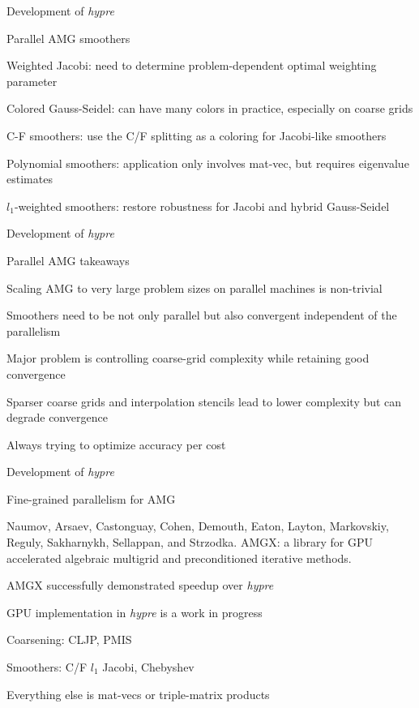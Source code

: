 \documentclass[18pt,xcolor=table]{beamer}
\begin{document}
\begin{frame}{Development of \emph{hypre}}
\begin{block}{Parallel AMG smoothers}
\bit
\item Weighted Jacobi: need to determine problem-dependent optimal weighting parameter
\item Colored Gauss-Seidel: can have many colors in practice, especially on coarse grids
\item C-F smoothers: use the C/F splitting as a coloring for Jacobi-like smoothers
\item Polynomial smoothers: application only involves mat-vec, but requires eigenvalue estimates
\item $l_1$-weighted smoothers: restore robustness for Jacobi and hybrid Gauss-Seidel
\eit
\end{block}
\end{frame}

\begin{frame}{Development of \emph{hypre}}
\begin{block}{Parallel AMG takeaways}
\bit
\item Scaling AMG to very large problem sizes on parallel machines is non-trivial
\item Smoothers need to be not only parallel but also convergent independent of the parallelism
\item Major problem is controlling coarse-grid complexity while retaining good convergence
\item Sparser coarse grids and interpolation stencils lead to lower complexity but can degrade convergence
\item Always trying to optimize accuracy per cost
\eit
\end{block}
\end{frame}

\begin{frame}{Development of \emph{hypre}}
\begin{block}{Fine-grained parallelism for AMG}
\bit
\item Naumov, Arsaev, Castonguay, Cohen, Demouth, Eaton, Layton, Markovskiy, Reguly, Sakharnykh, Sellappan, and Strzodka. AMGX: a library for GPU accelerated algebraic multigrid and preconditioned iterative methods.
\item AMGX successfully demonstrated speedup over \emph{hypre}
\item GPU implementation in \emph{hypre} is a work in progress
\item Coarsening: CLJP, PMIS
\item Smoothers: C/F $l_1$ Jacobi, Chebyshev
\item Everything else is mat-vecs or triple-matrix products
\eit
\end{block}
\end{frame}
\end{document}

